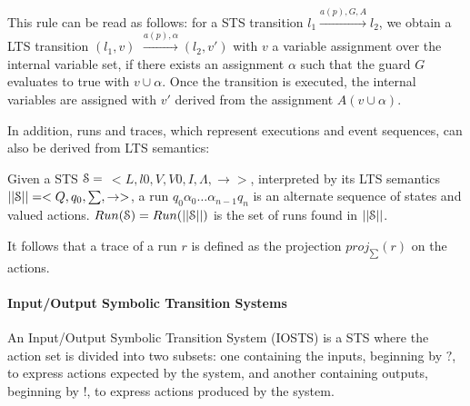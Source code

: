 This rule can be read as follows: for a STS transition $l_1
\xrightarrow{a(p),G,A}l_2$, we obtain a LTS transition $(l_1,v)$
$\xrightarrow{a(p),\alpha} (l_2,v')$ with $v$ a variable
assignment over the internal variable set, if there exists an
assignment $\alpha$ such that the guard $G$ evaluates to true
with $v \cup \alpha$. Once the transition is executed, the
internal variables are assigned with $v'$ derived from the
assignment $A(v \cup \alpha)$.

In addition, runs and traces, which represent executions and
event sequences, can also be derived from LTS semantics:

\begin{definition}
    Given a STS $\EuScript{S}=$ $<L,l0,V,V0,I,\Lambda,
	\rightarrow>$, interpreted by its LTS semantics
	$||\EuScript{S}||=<Q,q_0,\sum,\rightarrow>$, a run $q_0
	\alpha_0 \dots \alpha_{n-1} q_n$ is an alternate sequence of states
    and valued actions. $Run(\EuScript{S})=Run(||\EuScript{S}||)$ is
	the set of runs found in $||\EuScript{S}||$.

    It follows that a trace of a run $r$ is defined as the
    projection $proj_{\sum}(r)$ on the actions.

	\label{def:runs-and-traces}
\end{definition}

\paragraph{Input/Output Symbolic Transition Systems}
\label{sec:definitions:iosts}

An Input/Output Symbolic Transition System (IOSTS) is a STS where
the action set is divided into two subsets: one containing the
inputs, beginning by $?$, to express actions expected by the
system, and another containing outputs, beginning by $!$, to
express actions produced by the system.

